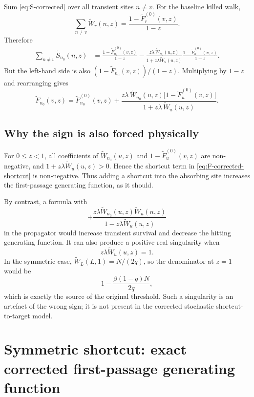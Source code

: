 \documentclass[11pt]{article}
\newcommand{\wt}{\widetilde}
\begin{document}
Sum \eqref{eq:S-corrected} over all transient sites $n\neq v$.  For the baseline killed walk,
\begin{equation}
  \sum_{n\neq v}\wt W_r(n,z)=\frac{1-\wt F^{(0)}_r(v,z)}{1-z}.
  \label{eq:survival-gen-relation}
\end{equation}
Therefore
\begin{align}
  \sum_{n\neq v}\wt S_{n_0}(n,z)
  &=\frac{1-\wt F^{(0)}_{n_0}(v,z)}{1-z}
  -\frac{z\lambda\,\wt W_{n_0}(u,z)}{1+z\lambda\wt W_u(u,z)}
  \frac{1-\wt F^{(0)}_u(v,z)}{1-z}.
\end{align}
But the left-hand side is also $(1-\wt F_{n_0}(v,z))/(1-z)$.  Multiplying by $1-z$ and rearranging
gives
\begin{equation}
  \boxed{
  \wt F_{n_0}(v,z)=\wt F^{(0)}_{n_0}(v,z)+
  \frac{z\lambda\,\wt W_{n_0}(u,z)\bigl[1-\wt F^{(0)}_u(v,z)\bigr]}
  {1+z\lambda\,\wt W_u(u,z)}.}
  \label{eq:F-corrected-shortcut}
\end{equation}

\subsection{Why the sign is also forced physically}

For $0\leq z<1$, all coefficients of $\wt W_{n_0}(u,z)$ and
$1-\wt F^{(0)}_u(v,z)$ are non-negative, and $1+z\lambda\wt W_u(u,z)>0$.  Hence the shortcut term
in \eqref{eq:F-corrected-shortcut} is non-negative.  Thus adding a shortcut into the absorbing
site increases the first-passage generating function, as it should.

By contrast, a formula with
\begin{equation}
  +\frac{z\lambda\wt W_{n_0}(u,z)\wt W_u(n,z)}{1-z\lambda\wt W_u(u,z)}
\end{equation}
in the propagator would increase transient survival and decrease the hitting generating function.
It can also produce a positive real singularity when
\begin{equation}
  z\lambda\wt W_u(u,z)=1.
\end{equation}
In the symmetric case, $\wt W_L(L,1)=N/(2q)$, so the denominator at $z=1$ would be
\begin{equation}
  1-\frac{\beta(1-q)N}{2q},
\end{equation}
which is exactly the source of the original threshold.  Such a singularity is an artefact of the
wrong sign; it is not present in the corrected stochastic shortcut-to-target model.

\section{Symmetric shortcut: exact corrected first-passage generating function}
\label{sec:symmetric-shortcut}
\end{document}
